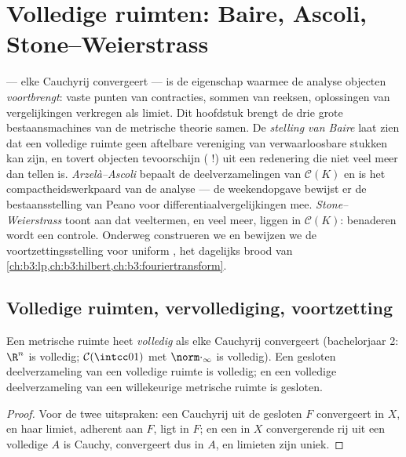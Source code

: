 \chapter{Volledige ruimten: Baire, Ascoli, Stone--Weierstrass}
\label{ch:b3:complete}

 --- elke Cauchyrij convergeert --- is de eigenschap
waarmee de analyse objecten \emph{voortbrengt}: vaste punten van
contracties, sommen van reeksen, oplossingen van vergelijkingen
verkregen als limiet. Dit hoofdstuk brengt de drie grote
bestaansmachines van de metrische theorie samen. De \emph{stelling
van Baire} laat zien dat een volledige ruimte geen aftelbare
vereniging van verwaarloosbare stukken kan zijn, en tovert
objecten tevoorschijn ( !) uit een redenering die niet veel meer dan tellen is.
\emph{Arzelà--Ascoli} bepaalt de  deelverzamelingen van
$\mathcal C(K)$ en is het compactheidswerkpaard van de analyse ---
de weekendopgave bewijst er de bestaansstelling van Peano voor
differentiaalvergelijkingen mee. \emph{Stone--Weierstrass} toont
aan dat veeltermen, en veel meer,  liggen in $\mathcal C(K)$:
benaderen wordt een  controle. Onderweg construeren we
 en bewijzen we de voortzettingsstelling voor
uniform , het dagelijks brood van
\cref{ch:b3:lp,ch:b3:hilbert,ch:b3:fouriertransform}.

\section{Volledige ruimten, vervollediging, voortzetting}

\begin{definition}\label{def:b3:complete:complete}
Een metrische ruimte heet \emph{volledig} als elke Cauchyrij convergeert (bachelorjaar 2:
$\R^n$ is volledig; $\mathcal C(\intcc01)$ met
$\norm\cdot_\infty$ is volledig). Een gesloten deelverzameling van
een volledige ruimte is volledig; en een volledige deelverzameling
van een willekeurige metrische ruimte is gesloten.
\end{definition}

\begin{proof}
Voor de twee uitspraken: een Cauchyrij uit de gesloten $F$
convergeert in $X$, en haar limiet, adherent aan $F$, ligt in $F$;
en een in $X$ convergerende rij uit een volledige $A$ is Cauchy,
convergeert dus in $A$, en limieten zijn uniek.
\end{proof}

